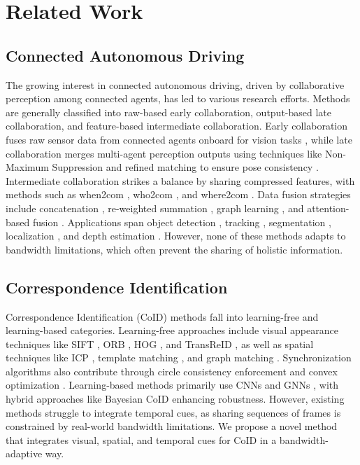 \section{Related Work}
\label{sec:related}
\subsection{Connected Autonomous Driving} The growing interest in connected autonomous driving, driven by collaborative perception among connected agents, has led to various research efforts. Methods are generally classified into raw-based early collaboration, output-based late collaboration, and feature-based intermediate collaboration. Early collaboration fuses raw sensor data from connected agents onboard for vision tasks \cite{arnold2020cooperative}, while late collaboration merges multi-agent perception outputs using techniques like Non-Maximum Suppression \cite{forsyth2014object} and refined matching to ensure pose consistency \cite{song2023cooperative}. Intermediate collaboration strikes a balance by sharing compressed features, with methods such as when2com \cite{liu2020when2com}, who2com \cite{liu2020who2com}, and where2com \cite{hu2022where2comm}. Data fusion strategies include concatenation \cite{chen2019f}, re-weighted summation \cite{guo2021coff}, graph learning \cite{wang2020v2vnet, zhou2022multi}, and attention-based fusion \cite{xu2022v2x, xu2022opv2v}. Applications span object detection \cite{bi2022edge}, tracking \cite{li2021learning}, segmentation \cite{xu2022cobevt}, localization \cite{yuan2022keypoints}, and depth estimation \cite{hu2023collaboration}. However, none of these methods adapts to bandwidth limitations, which often prevent the sharing of holistic information.

\subsection{Correspondence Identification} Correspondence Identification (CoID) methods fall into learning-free and learning-based categories. Learning-free approaches include visual appearance techniques like SIFT \cite{engel2014lsd}, ORB \cite{mur2015orb}, HOG \cite{dalal2005histograms}, and TransReID \cite{he2021transreid}, as well as spatial techniques like ICP \cite{rusinkiewicz2001efficient}, template matching \cite{zhang20232}, and graph matching \cite{gao2020correspondence, gao2021regularized}. Synchronization algorithms also contribute through circle consistency enforcement \cite{fathian2020clear} and convex optimization \cite{hu2018distributable}. Learning-based methods primarily use CNNs \cite{jin2020semantics,khatun2020semantic, voigtlaender2019mots} and GNNs \cite{wang2019learning,zhang2019deep, fey2019deep}, with hybrid approaches like Bayesian CoID \cite{gao2021bayesian, gao2022correspondence} enhancing robustness. However, existing methods struggle to integrate temporal cues, as sharing sequences of frames is constrained by real-world bandwidth limitations. We propose a novel method that integrates visual, spatial, and temporal cues for CoID in a bandwidth-adaptive way.

